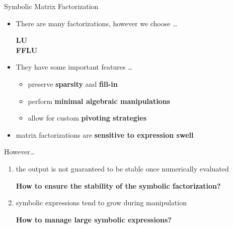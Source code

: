 \begin{frame}{Symbolic Matrix Factorization}
  \begin{itemize}
    \item There are many factorizations, however we choose \dots \\
    \begin{small}
      \qquad \textbf{\ac{LU}} \\
      \qquad \textbf{\ac{FFLU}}
    \end{small}
    \item They have some important features \dots \\
    \begin{itemize}
      \item preserve \textbf{sparsity} and \textbf{fill-in}
      \item perform \textbf{minimal algebraic manipulations}
      \item allow for custom \textbf{pivoting strategies}
    \end{itemize}
    \item \Maple{} matrix factorizations are \textbf{sensitive to expression swell}
  \end{itemize}
  However\dots
  \begin{enumerate}
    \item the output is not guaranteed to be stable once numerically evaluated \\
    \begin{small}
      \qquad \textbf{How to ensure the stability of the symbolic factorization?}
    \end{small}
    \item symbolic expressions tend to grow during manipulation \\
    \begin{small}
      \qquad \textbf{How to manage large symbolic expressions?}
    \end{small}
  \end{enumerate}
\end{frame}


